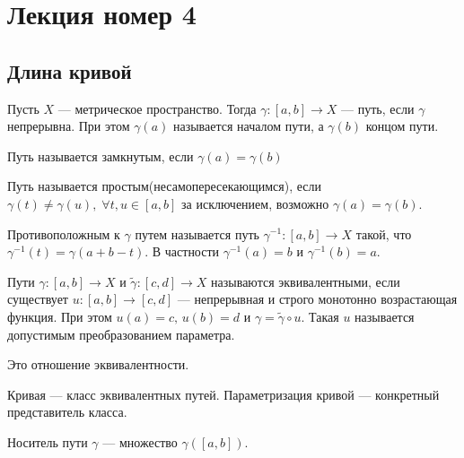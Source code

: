 \section{Лекция номер 4}

\subsection{Длина кривой}
%
\begin{conj}
  Пусть $X$ --- метрическое пространство. Тогда
  $\gamma\colon [a, b] \to X$ --- путь, если $\gamma$ непрерывна. При этом $\gamma(a)$ называется началом пути, а $\gamma(b)$ концом пути.
\end{conj}

\begin{conj}
  Путь называется замкнутым, если $\gamma(a) = \gamma(b)$
\end{conj}

\begin{conj}
  Путь называется простым(несамопересекающимся), если  $\gamma(t) \neq \gamma(u),\; \forall t, u \in [a, b]$ за исключением, возможно $\gamma(a) = \gamma(b)$.
\end{conj}

\begin{conj}
  Противоположным к $\gamma$ путем называется путь $\gamma^{-1}\colon [a, b] \to X$ такой, что $\gamma^{-1}(t) = \gamma(a + b - t)$. В частности $\gamma^{-1}(a) = b$ и $\gamma^{-1}(b) = a$.
\end{conj}

\begin{conj}
  Пути $\gamma\colon[a, b] \to X$ и $\widetilde{\gamma}\colon[c, d] \to X$ называются эквивалентными, если существует $u\colon [a, b] \to [c, d]$ --- непрерывная и строго монотонно возрастающая функция. При этом $u(a) = c,\, u(b) = d$ и $\gamma = \widetilde{\gamma} \circ u$.
  Такая $u$ называется допустимым преобразованием параметра.
\end{conj}

\begin{notice}
  Это отношение эквивалентности.
\end{notice}

\begin{conj}
  Кривая --- класс эквивалентных путей. Параметризация кривой --- конкретный представитель класса.
\end{conj}

\begin{conj}
  Носитель пути $\gamma$ --- множество $\gamma([a, b])$.
\end{conj}

